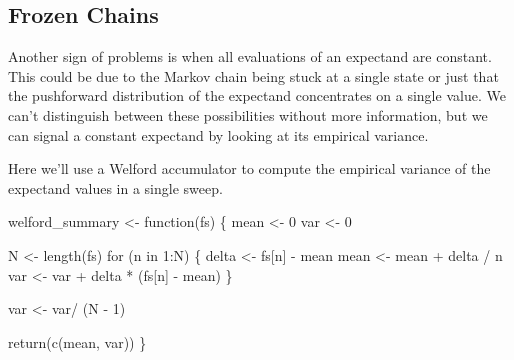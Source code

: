 \documentclass[
  letterpaper,
  DIV=11,
  numbers=noendperiod]{scrartcl}
\newenvironment{Shaded}{\begin{snugshade}}{\end{snugshade}}
\newcommand{\ControlFlowTok}[1]{\textcolor[rgb]{0.00,0.23,0.31}{#1}}
\newcommand{\DecValTok}[1]{\textcolor[rgb]{0.68,0.00,0.00}{#1}}
\newcommand{\FunctionTok}[1]{\textcolor[rgb]{0.28,0.35,0.67}{#1}}
\newcommand{\NormalTok}[1]{\textcolor[rgb]{0.00,0.23,0.31}{#1}}
\newcommand{\OtherTok}[1]{\textcolor[rgb]{0.00,0.23,0.31}{#1}}
\newcommand{\SpecialCharTok}[1]{\textcolor[rgb]{0.37,0.37,0.37}{#1}}
\begin{document}
\hypertarget{frozen-chains}{%
\subsection{Frozen Chains}\label{frozen-chains}}

Another sign of problems is when all evaluations of an expectand are
constant. This could be due to the Markov chain being stuck at a single
state or just that the pushforward distribution of the expectand
concentrates on a single value. We can't distinguish between these
possibilities without more information, but we can signal a constant
expectand by looking at its empirical variance.

Here we'll use a Welford accumulator to compute the empirical variance
of the expectand values in a single sweep.

\begin{Shaded}
\begin{Highlighting}[]
\NormalTok{welford\_summary }\OtherTok{\textless{}{-}} \ControlFlowTok{function}\NormalTok{(fs) \{}
\NormalTok{  mean }\OtherTok{\textless{}{-}} \DecValTok{0}
\NormalTok{  var }\OtherTok{\textless{}{-}} \DecValTok{0}

\NormalTok{  N }\OtherTok{\textless{}{-}} \FunctionTok{length}\NormalTok{(fs)}
  \ControlFlowTok{for}\NormalTok{ (n }\ControlFlowTok{in} \DecValTok{1}\SpecialCharTok{:}\NormalTok{N) \{}
\NormalTok{    delta }\OtherTok{\textless{}{-}}\NormalTok{ fs[n] }\SpecialCharTok{{-}}\NormalTok{ mean}
\NormalTok{    mean }\OtherTok{\textless{}{-}}\NormalTok{ mean }\SpecialCharTok{+}\NormalTok{ delta }\SpecialCharTok{/}\NormalTok{ n}
\NormalTok{    var }\OtherTok{\textless{}{-}}\NormalTok{ var }\SpecialCharTok{+}\NormalTok{ delta }\SpecialCharTok{*}\NormalTok{ (fs[n] }\SpecialCharTok{{-}}\NormalTok{ mean)}
\NormalTok{  \}}

\NormalTok{  var }\OtherTok{\textless{}{-}}\NormalTok{ var}\SpecialCharTok{/}\NormalTok{ (N }\SpecialCharTok{{-}} \DecValTok{1}\NormalTok{)}

  \FunctionTok{return}\NormalTok{(}\FunctionTok{c}\NormalTok{(mean, var))}
\NormalTok{\}}
\end{Highlighting}
\end{Shaded}
\end{document}
